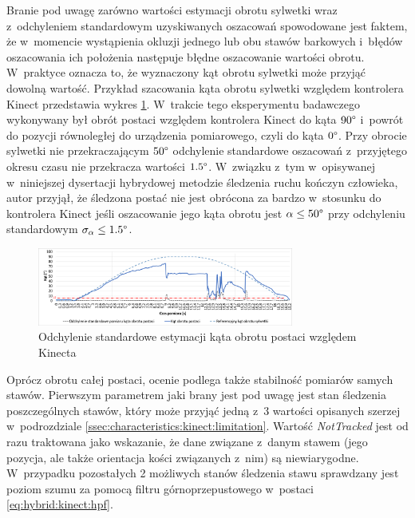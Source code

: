 Branie pod uwagę zarówno wartości estymacji obrotu sylwetki 
wraz z~odchyleniem standardowym uzyskiwanych oszacowań spowodowane jest faktem, że w~momencie wystąpienia okluzji jednego lub obu stawów barkowych i~błędów oszacowania ich położenia następuje błędne oszacowanie wartości obrotu. W~praktyce oznacza to, że wyznaczony kąt obrotu sylwetki może przyjąć dowolną wartość. Przykład szacowania kąta obrotu sylwetki względem kontrolera Kinect przedstawia wykres \ref{fig:hybrid:kinect:kinectRotationVariance}. W~trakcie tego eksperymentu badawczego wykonywany był obrót postaci względem kontrolera Kinect do kąta $90\degree$ i~powrót do pozycji równoległej do urządzenia pomiarowego, czyli do kąta $0\degree$. Przy obrocie sylwetki nie przekraczającym $50\degree$ odchylenie standardowe oszacowań z~przyjętego okresu czasu nie przekracza wartości $1.5\degree$. W~związku z~tym w~opisywanej w~niniejszej dysertacji hybrydowej metodzie śledzenia ruchu kończyn człowieka, autor przyjął, że śledzona postać nie jest obrócona za bardzo w~stosunku do kontrolera Kinect jeśli oszacowanie jego kąta obrotu jest $\alpha \le 50\degree$ przy odchyleniu standardowym $\sigma_\alpha\le 1.5 \degree$.

\begin{figure}[!htp]
	\centering
												
	\includegraphics[width=0.75\textwidth]{images/kinectRotationStdDev.png}
	\caption{Odchylenie standardowe estymacji kąta obrotu postaci względem Kinecta}
											
	\label{fig:hybrid:kinect:kinectRotationVariance}
\end{figure}

Oprócz obrotu całej postaci, ocenie podlega także stabilność pomiarów samych stawów. Pierwszym parametrem jaki brany jest pod uwagę jest stan śledzenia poszczególnych stawów, który może przyjąć jedną z~3 wartości opisanych szerzej w~podrozdziale \ref{ssec:characteristics:kinect:limitation}. Wartość \emph{NotTracked} jest od razu traktowana jako wskazanie, że dane związane z~danym stawem (jego pozycja, ale także orientacja kości związanych z~nim) są niewiarygodne. W~przypadku pozostałych 2 możliwych stanów śledzenia stawu sprawdzany jest poziom szumu za pomocą filtru górnoprzepustowego w~postaci \ref{eq:hybrid:kinect:hpf}. 

